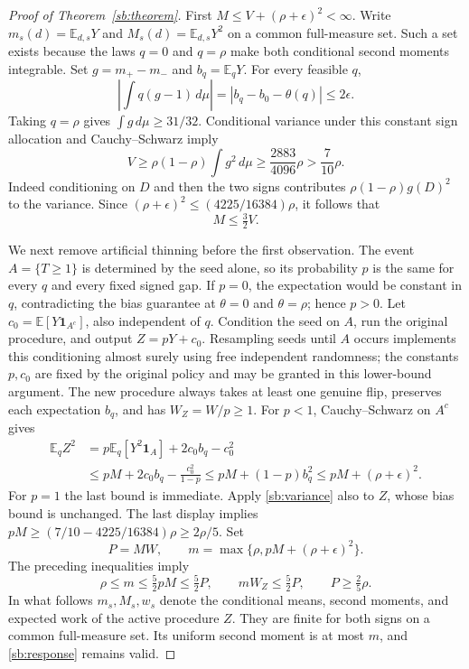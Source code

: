 \begin{proof}[Proof of Theorem~\ref{sb:theorem}]
First $M\le V+(\rho+\epsilon)^2<\infty$. Write
$m_s(d)=\mathbb E_{d,s}Y$ and $M_s(d)=\mathbb E_{d,s}Y^2$ on a common
full-measure set. Such a set exists because the laws $q=0$ and $q=\rho$
make both conditional second moments integrable. Set $g=m_+-m_-$ and
$b_q=\mathbb E_qY$. For every feasible $q$,
\begin{equation}\label{sb:response}
 \left|\int q(g-1)\,d\mu\right|
 =|b_q-b_0-\theta(q)|\le2\epsilon.
\end{equation}
Taking $q=\rho$ gives $\int g\,d\mu\ge31/32$. Conditional variance under
this constant sign allocation and Cauchy--Schwarz imply
\begin{equation}\label{sb:variance}
 V\ge\rho(1-\rho)\int g^2\,d\mu
 \ge\frac{2883}{4096}\rho>\frac7{10}\rho.
\end{equation}
Indeed conditioning on $D$ and then the two signs contributes
$\rho(1-\rho)g(D)^2$ to the variance. Since
$(\rho+\epsilon)^2\le(4225/16384)\rho$, it follows that
\begin{equation}\label{sb:M-V}
 M\le\tfrac32 V.
\end{equation}

We next remove artificial thinning before the first observation. The event
$A=\{T\ge1\}$ is determined by the seed alone, so its probability $p$ is
the same for every $q$ and every fixed signed gap. If $p=0$, the expectation
would be constant in $q$, contradicting the bias guarantee at
$\theta=0$ and $\theta=\rho$; hence $p>0$. Let
$c_0=\mathbb E[Y\mathbf1_{A^c}]$, also independent of $q$.
Condition the seed on $A$, run the original procedure, and output
$Z=pY+c_0$. Resampling seeds until $A$ occurs implements this conditioning
almost surely using free independent randomness; the constants $p,c_0$
are fixed by the original policy and may be granted in this lower-bound
argument. The new procedure always takes at least one genuine flip,
preserves each expectation $b_q$, and has
$W_Z=W/p\ge1$.
For $p<1$, Cauchy--Schwarz on $A^c$ gives
\begin{align*}
 \mathbb E_qZ^2
 &=p\mathbb E_q[Y^2\mathbf1_A]+2c_0b_q-c_0^2\\
 &\le pM+2c_0b_q-\frac{c_0^2}{1-p}
 \le pM+(1-p)b_q^2
 \le pM+(\rho+\epsilon)^2.
\end{align*}
For $p=1$ the last bound is immediate. Apply \eqref{sb:variance} also to
$Z$, whose bias bound is unchanged. The last display implies
$pM\ge(7/10-4225/16384)\rho\ge2\rho/5$.
Set
\[
 P=MW,\qquad
 m=\max\{\rho,pM+(\rho+\epsilon)^2\}.
\]
The preceding inequalities imply
\begin{equation}\label{sb:normalization}
 \rho\le m\le\tfrac52pM\le\tfrac52P,
 \qquad mW_Z\le\tfrac52P,
 \qquad P\ge\tfrac25\rho.
\end{equation}
In what follows $m_s,M_s,w_s$ denote the conditional means, second moments,
and expected work of the active procedure $Z$. They are finite for both
signs on a common full-measure set. Its uniform second moment is at most
$m$, and \eqref{sb:response} remains valid.


\end{proof}
